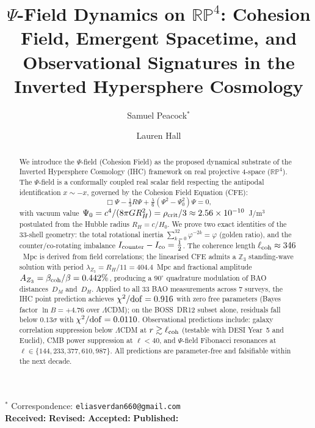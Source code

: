 \documentclass[12pt,a4paper]{article}
\theoremstyle{remark}
\begin{document}
\title{\textbf{$\Psi$-Field Dynamics on $\mathbb{RP}^4$: Cohesion Field,
Emergent Spacetime, and Observational Signatures in the
Inverted Hypersphere Cosmology}}

\author{
  Samuel Peacock$^{*}$
  \and
  Lauren Hall
}

\date{}

\maketitle

\noindent
$^*$ Correspondence: \texttt{eliasverdan660@gmail.com}\\[6pt]
\noindent
\textbf{Received:} \quad \textbf{Revised:} \quad \textbf{Accepted:} \quad \textbf{Published:}

\begin{abstract}
We introduce the $\Psi$-field (Cohesion Field) as the proposed dynamical substrate
of the Inverted Hypersphere Cosmology (IHC) framework on real projective 4-space
($\mathbb{RP}^4$). The $\Psi$-field is a conformally coupled real scalar field
respecting the antipodal identification $x \sim -x$, governed by the
Cohesion Field Equation (CFE):
\begin{equation*}
\Box\Psi - \tfrac{1}{3}R\Psi + \tfrac{\lambda}{6}\!\left(\Psi^2-\Psi_0^2\right)\Psi = 0,
\end{equation*}
with vacuum value $\Psi_0 = c^4/(8\pi GR_H^2) = \rho_{\rm crit}/3
\approx 2.56\times10^{-10}$~J/m$^3$ postulated from the Hubble radius $R_H = c/H_0$.
We prove two exact identities of the 33-shell geometry:
the total rotational inertia $\sum_{k=0}^{32}\varphi^{-2k} = \varphi$ (golden ratio),
and the counter/co-rotating imbalance $I_{\rm counter}-I_{\rm co} = \tfrac{1}{2}$.
The coherence length $\ell_{\rm coh} \approx 346$~Mpc is derived from
field correlations; the linearised CFE admits a $\mathbb{Z}_3$ standing-wave
solution with period $\lambda_{Z_3} = R_H/11 = 404.4$~Mpc and fractional
amplitude $A_{Z_3} = \beta_{\rm coh}/\beta = 0.442\%$, producing a $90^\circ$
quadrature modulation of BAO distances~$D_M$ and~$D_H$.
Applied to all 33 BAO measurements across 7 surveys, the IHC point prediction
achieves $\chi^2/{\rm dof} = 0.916$ with zero free parameters
(Bayes factor $\ln B = +4.76$ over $\Lambda$CDM); on the BOSS~DR12 subset alone,
residuals fall below $0.13\sigma$ with $\chi^2/{\rm dof} = 0.0110$.
Observational predictions include: galaxy correlation suppression below
$\Lambda$CDM at $r \gtrsim \ell_{\rm coh}$ (testable with DESI Year~5 and Euclid),
CMB power suppression at $\ell < 40$, and $\Psi$-field Fibonacci resonances at
$\ell \in \{144, 233, 377, 610, 987\}$.
All predictions are parameter-free and falsifiable within the next decade.
\end{abstract}
\end{document}
